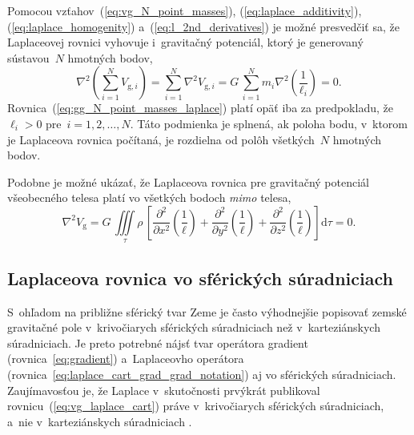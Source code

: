 \documentclass[a4paper, 12pt]{book}
\newcommand{\diff}{\mathrm d}
\newcommand{\gidx}{\mathrm g}
\begin{document}
Pomocou vzťahov~(\ref{eq:vg_N_point_masses}), (\ref{eq:laplace_additivity}), 
(\ref{eq:laplace_homogenity}) a~(\ref{eq:l_2nd_derivatives}) je možné 
presvedčiť sa, že Laplaceovej rovnici vyhovuje i~gravitačný potenciál, ktorý je 
generovaný sústavou~$N$ hmotných bodov,
%
\begin{equation}
\label{eq:gg_N_point_masses_laplace}
\nabla^2 \left( \sum_{i = 1}^N V_{\gidx,i} \right) = \sum_{i = 1}^N \nabla^2
V_{\gidx,i} = G \, \sum_{i = 1}^N m_i \nabla^2 \left( \frac{1}{\ell_i} \right) 
= 0{.}
\end{equation}
%
Rovnica~(\ref{eq:gg_N_point_masses_laplace}) platí opäť iba za predpokladu, 
že~$\ell_i > 0$ pre~$i = 1, 2, \dots, N$.  Táto podmienka je splnená, ak poloha 
bodu, v~ktorom je Laplaceova rovnica počítaná, je rozdielna od polôh 
všetkých~$N$ hmotných bodov.

Podobne je možné ukázať, že Laplaceova rovnica pre gravitačný potenciál 
všeobecného telesa platí vo všetkých bodoch \emph{mimo} telesa,
%
\begin{equation}
\nabla^2 V_\gidx = G\, \iiint\limits_\tau \rho \, \left[ 
\frac{\partial^2}{\partial
x^2}\left(\frac{1}{\ell}\right) + \frac{\partial^2}{\partial
y^2}\left(\frac{1}{\ell}\right) + \frac{\partial^2}{\partial
z^2}\left(\frac{1}{\ell}\right) \right] \diff\tau = 0{.}
\end{equation}


\subsection{Laplaceova rovnica vo sférických súradniciach}
\label{sec:laplace_equation_sph}

S~ohľadom na približne sférický tvar Zeme je často výhodnejšie popisovať zemské 
gravitačné pole v~krivočiarych sférických súradniciach než v~karteziánskych 
súradniciach.  Je preto potrebné nájsť tvar operátora gradient 
(rovnica~\ref{eq:gradient}) a~Laplaceovho operátora 
(rovnica~\ref{eq:laplace_cart_grad_grad_notation}) aj vo sférických 
súradniciach.  Zaujímavosťou je, že Laplace v~skutočnosti prvýkrát publikoval 
rovnicu~(\ref{eq:vg_laplace_cart}) práve v~krivočiarych sférických 
súradniciach, a~nie v~karteziánskych súradniciach \parencite{MacMillan1930}.
\end{document}
